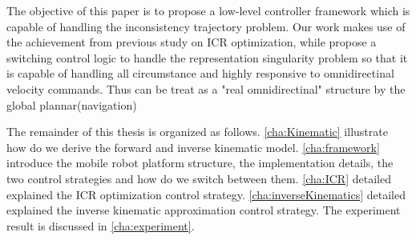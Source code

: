The objective of this paper is to propose a low-level controller framework which is capable of handling the inconsistency trajectory problem. Our work makes use of the achievement from previous study on ICR optimization, while propose a switching control logic to handle the representation singularity problem so that it is capable of handling all circumstance and highly responsive to omnidirectinal velocity commands. 
Thus can be treat as a "real omnidirectinal" structure by the global plannar(navigation)

The remainder of this thesis is organized as follows.
\cref{cha:Kinematic} illustrate how do we derive the forward and inverse kinematic model.
\cref{cha:framework} introduce the mobile robot platform structure, the implementation details, the two control strategies and how do we switch between them.
\cref{cha:ICR} detailed explained the ICR optimization control strategy.
\cref{cha:inverseKinematics} detailed explained the inverse kinematic approximation control strategy.
The experiment result is discussed in \cref{cha:experiment}.